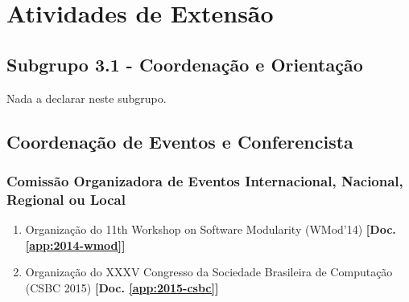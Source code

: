 \documentclass[a4paper,oneside,10pt]{article}
\begin{document}
\newpage
\section{Atividades de Extens\~{a}o}

\subsection{Subgrupo 3.1 - Coordenação e Orientação}
\vspace{0.3cm}

Nada a declarar neste subgrupo.

%
%

\subsection{Coordenação de Eventos e Conferencista}
\vspace{0.3cm}


\subsubsection{Comiss\~{a}o Organizadora de Eventos Internacional, Nacional, Regional ou Local}
\vspace{0.3cm}

\begin{enumerate}
\renewcommand{\labelenumi}{{\large\bfseries\arabic{enumi}.}}

    \item Organização do 11th Workshop on Software Modularity (WMod'14) \textbf{[Doc. \ref{app:2014-wmod}]}

    \item Organização do XXXV Congresso da Sociedade Brasileira de Computação (CSBC 2015) \textbf{[Doc. \ref{app:2015-csbc}]}




\end{enumerate}
\end{document}
